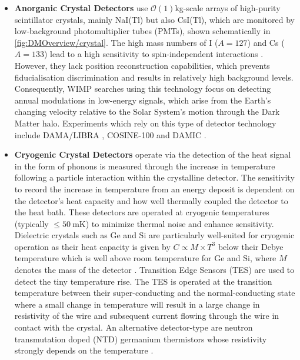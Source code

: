 \begin{itemize}
    \item \textbf{Anorganic Crystal Detectors} use $\mathcal{O}(1)$kg-scale arrays of high-purity scintillator crystals, mainly NaI(Tl) but also CsI(Tl), which are monitored by low-background photomultiplier tubes (PMTs), shown schematically in \autoref{fig:DMOverview/crystal}. The high mass numbers of I ($A=127$) and Cs ($A=133$) lead to a high sensitivity to spin-independent interactions \cite{Schumann:2019eaa}. However, they lack position reconstruction capabilities, which prevents fiducialisation discrimination and results in relatively high background levels. Consequently, WIMP searches using this technology focus on detecting annual modulations in low-energy signals, which arise from the Earth’s changing velocity relative to the Solar System's motion through the Dark Matter halo. Experiments which rely on this type of detector technology include DAMA/LIBRA \cite{DAMA:2008jlt}, COSINE-100 \cite{COSINE-100:2019lgn} and DAMIC \cite{Privitera:2024tpq}.
    
    \item \textbf{Cryogenic Crystal Detectors} operate via the detection of the heat signal in the form of phonons is measured through the increase in temperature following a particle interaction within the crystalline detector. The sensitivity to record the increase in temperature from an energy deposit is dependent on the detector's heat capacity and how well thermally coupled the detector to the heat bath. These detectors are operated at cryogenic temperatures (typically $\leq50~\text{mK}$) to minimize thermal noise and enhance sensitivity. Dielectric crystals such as Ge and Si are particularly well-suited for cryogenic operation as their heat capacity is given by $C \propto M \times T^3$ below their Debye temperature which is well above room temperature for Ge and Si, where $M$ denotes the mass of the detector \cite{Schumann:2019eaa}. Transition Edge Sensors (TES) are used to detect the tiny temperature rise. The TES is operated at the transition temperature between their super-conducting and the normal-conducting state where a small change in temperature will result in a large change in resistivity of the wire and subsequent current flowing through the wire in contact with the crystal. An alternative detector-type are neutron transmutation doped (NTD) germanium thermistors whose resistivity strongly depends on the temperature \cite{Schumann:2019eaa}. 
    

\end{itemize}
